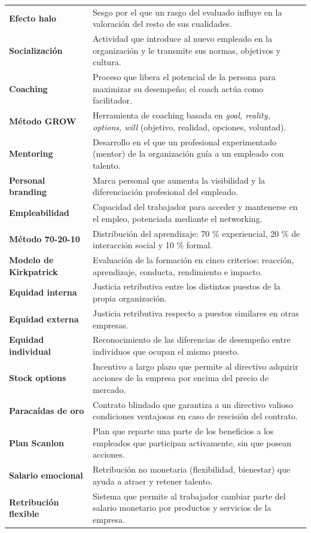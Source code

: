 \documentclass[12pt]{book} %
\begin{document}
\begin{longtable}[]{@{}
  >{\raggedright\arraybackslash}p{}
  >{\raggedright\arraybackslash}p{}@{}}
\textbf{Efecto halo} & Sesgo por el que un rasgo del evaluado influye en
la valoración del resto de sus cualidades. \\
\textbf{Socialización} & Actividad que introduce al nuevo empleado en la
organización y le transmite sus normas, objetivos y cultura. \\
\textbf{Coaching} & Proceso que libera el potencial de la persona para
maximizar su desempeño; el coach actúa como facilitador. \\
\textbf{Método GROW} & Herramienta de coaching basada en \emph{goal,
reality, options, will} (objetivo, realidad, opciones, voluntad). \\
\textbf{Mentoring} & Desarrollo en el que un profesional experimentado
(mentor) de la organización guía a un empleado con talento. \\
\textbf{Personal branding} & Marca personal que aumenta la visibilidad y
la diferenciación profesional del empleado. \\
\textbf{Empleabilidad} & Capacidad del trabajador para acceder y
mantenerse en el empleo, potenciada mediante el networking. \\
\textbf{Método 70-20-10} & Distribución del aprendizaje: 70 \%
experiencial, 20 \% de interacción social y 10 \% formal. \\
\textbf{Modelo de Kirkpatrick} & Evaluación de la formación en cinco
criterios: reacción, aprendizaje, conducta, rendimiento e impacto. \\
\textbf{Equidad interna} & Justicia retributiva entre los distintos
puestos de la propia organización. \\
\textbf{Equidad externa} & Justicia retributiva respecto a puestos
similares en otras empresas. \\
\textbf{Equidad individual} & Reconocimiento de las diferencias de
desempeño entre individuos que ocupan el mismo puesto. \\
\textbf{Stock options} & Incentivo a largo plazo que permite al
directivo adquirir acciones de la empresa por encima del precio de
mercado. \\
\textbf{Paracaídas de oro} & Contrato blindado que garantiza a un
directivo valioso condiciones ventajosas en caso de rescisión del
contrato. \\
\textbf{Plan Scanlon} & Plan que reparte una parte de los beneficios a
los empleados que participan activamente, sin que posean acciones. \\
\textbf{Salario emocional} & Retribución no monetaria (flexibilidad,
bienestar) que ayuda a atraer y retener talento. \\
\textbf{Retribución flexible} & Sistema que permite al trabajador
cambiar parte del salario monetario por productos y servicios de la
empresa. \\
\end{longtable}


\end{document}
